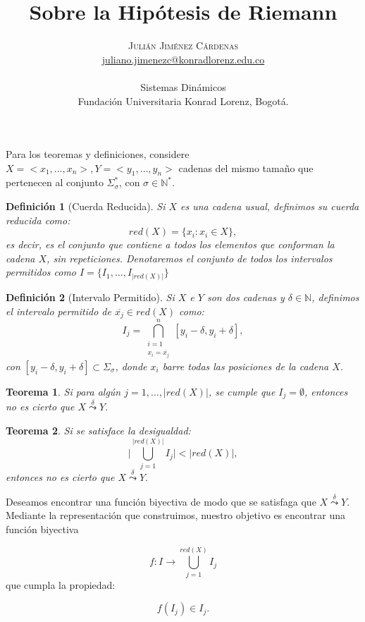 \documentclass[twocolumn]{article}
\title{Sobre la Hipótesis de Riemann} %
\author{%
\textsc{Julián Jiménez Cárdenas} \\[1ex] %
\normalsize \href{mailto:juliano.jimenezc@konradlorenz.edu.co}{juliano.jimenezc@konradlorenz.edu.co} %
\\ \\ \normalsize{Sistemas Dinámicos}
\\ \normalsize{Fundación Universitaria Konrad Lorenz, Bogotá.} %
}
\date{} %
\newtheorem{theorem}{Teorema}
\newtheorem{definition}{Definición}
\begin{document}
Para los teoremas y definiciones, considere $X=<x_1,\dots,x_n>,Y=<y_1,\dots,y_n>$ cadenas del mismo tamaño que pertenecen al conjunto $\Sigma_\sigma^*$, con $\sigma\in\mathbb{N^*}$. 
\begin{definition}[Cuerda Reducida]
Si $X$ es una cadena usual, definimos su cuerda reducida como:
\begin{equation}
	red(X)=\{x_i: x_i\in X\},
\end{equation}
es decir, es el conjunto que contiene a todos los elementos que conforman la cadena $X$, sin repeticiones. Denotaremos el conjunto de todos los intervalos permitidos como $I=\{I_1,\dots,I_{|red(X)|}\}$
\end{definition}


\begin{definition}[Intervalo Permitido]
Si $X$ e $Y$ son dos cadenas y $\delta\in\mathbb{N}$, definimos el intervalo permitido de $\overline{x_j}\in red(X)$ como:
\begin{equation}
	I_j=\bigcap\limits_{\substack{i=1 \\ x_i=\overline{x_j}}}^n [y_i-\delta,y_i+\delta],
\end{equation}
con $[y_i-\delta,y_i+\delta]\subset\Sigma_\sigma$, donde $x_i$ barre todas las posiciones de la cadena $X$.
\end{definition}

\begin{theorem}
Si para algún $j=1,\dots,|red(X)|$, se cumple que $I_j=\emptyset$, entonces no es cierto que $X\overset{\delta}{\leadsto} Y.$
\end{theorem}

\begin{theorem}
Si se satisface la desigualdad:
\begin{equation}
\Big|\bigcup\limits_{j=1}^{|red(X)|} I_j\Big|<|red(X)|,
\end{equation}
entonces no es cierto que $X\overset{\delta}{\leadsto} Y.$
\end{theorem}

Deseamos encontrar una función biyectiva de modo que se satisfaga que $X\overset{\delta}{\leadsto} Y.$ Mediante la representación que construimos, nuestro objetivo es encontrar una función biyectiva

$$f:I\rightarrow \bigcup\limits_{j=1}^{red(X)}I_j$$
que cumpla la propiedad:

$$f(I_j)\in I_j.$$
\end{document}
